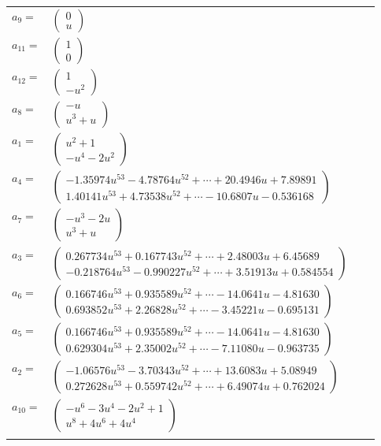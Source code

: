 \documentclass[1p]{elsarticle_modified}
\theoremstyle{definition}
\begin{document}
\begin{tabular}{m{7pt} m{180pt} m{7pt} m{180pt} }
\flushright $a_{9}=$&$\begin{pmatrix}0\\u\end{pmatrix}$ \\
\flushright $a_{11}=$&$\begin{pmatrix}1\\0\end{pmatrix}$ \\
\flushright $a_{12}=$&$\begin{pmatrix}1\\- u^2\end{pmatrix}$ \\
\flushright $a_{8}=$&$\begin{pmatrix}- u\\u^3+u\end{pmatrix}$ \\
\flushright $a_{1}=$&$\begin{pmatrix}u^2+1\\- u^4-2 u^2\end{pmatrix}$ \\
\flushright $a_{4}=$&$\begin{pmatrix}-1.35974 u^{53}-4.78764 u^{52}+\cdots+20.4946 u+7.89891\\1.40141 u^{53}+4.73538 u^{52}+\cdots-10.6807 u-0.536168\end{pmatrix}$ \\
\flushright $a_{7}=$&$\begin{pmatrix}- u^3-2 u\\u^3+u\end{pmatrix}$ \\
\flushright $a_{3}=$&$\begin{pmatrix}0.267734 u^{53}+0.167743 u^{52}+\cdots+2.48003 u+6.45689\\-0.218764 u^{53}-0.990227 u^{52}+\cdots+3.51913 u+0.584554\end{pmatrix}$ \\
\flushright $a_{6}=$&$\begin{pmatrix}0.166746 u^{53}+0.935589 u^{52}+\cdots-14.0641 u-4.81630\\0.693852 u^{53}+2.26828 u^{52}+\cdots-3.45221 u-0.695131\end{pmatrix}$ \\
\flushright $a_{5}=$&$\begin{pmatrix}0.166746 u^{53}+0.935589 u^{52}+\cdots-14.0641 u-4.81630\\0.629304 u^{53}+2.35002 u^{52}+\cdots-7.11080 u-0.963735\end{pmatrix}$ \\
\flushright $a_{2}=$&$\begin{pmatrix}-1.06576 u^{53}-3.70343 u^{52}+\cdots+13.6083 u+5.08949\\0.272628 u^{53}+0.559742 u^{52}+\cdots+6.49074 u+0.762024\end{pmatrix}$ \\
\flushright $a_{10}=$&$\begin{pmatrix}- u^6-3 u^4-2 u^2+1\\u^8+4 u^6+4 u^4\end{pmatrix}$\\&\end{tabular}
\end{document}
